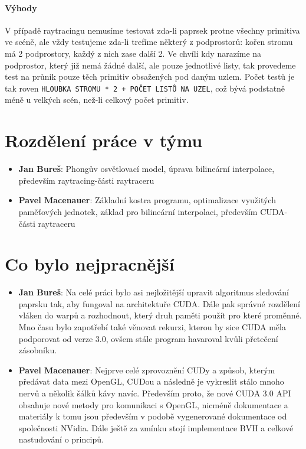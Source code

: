 \documentclass[12pt,a4paper,titlepage,final]{report}
\begin{document}
\paragraph{Výhody} V případě raytracingu nemusíme testovat zda-li paprsek protne všechny primitiva ve scéně, ale vždy testujeme zda-li trefíme některý z podprostorů: kořen stromu má 2 podprostory, každý z nich zase další 2. Ve chvíli kdy narazíme na podprostor, který již nemá žádné další, ale pouze jednotlivé listy, tak provedeme test na průnik pouze těch primitiv obsažených pod daným uzlem. Počet testů je tak roven \verb|HLOUBKA STROMU * 2 + POČET LISTŮ NA UZEL|, což bývá podstatně méně u velkých scén, než-li celkový počet primitiv.


\section{Rozdělení práce v týmu}

\begin{itemize}
\item \textbf{Jan Bureš}: Phongův osvětlovací model, úprava bilineární interpolace, především raytracing-části raytraceru
\item \textbf{Pavel Macenauer}: Základní kostra programu, optimalizace využitých paměťových jednotek, základ pro bilineární interpolaci, především CUDA-části raytraceru 
\end{itemize}

\section{Co bylo nejpracnější}

\begin{itemize}
\item \textbf{Jan Bureš}: Na celé práci bylo asi nejložitější upravit algoritmus sledování paprsku tak, aby fungoval na architektuře CUDA. Dále pak správné rozdělení vláken do warpů a rozhodnout, který druh paměti použít pro které proměnné. Mno času bylo zapotřebí také věnovat rekurzi, kterou by sice CUDA měla podporovat od verze 3.0, ovšem stále program havaroval kvůli přetečení zásobníku.
\item \textbf{Pavel Macenauer}: Nejprve celé zprovoznění CUDy a způsob, kterým předávat data mezi OpenGL, CUDou a následně je vykreslit stálo mnoho nervů a několik šálků kávy navíc. Především proto, že nové CUDA 3.0 API obsahuje nové metody pro komunikaci s OpenGL, nicméně dokumentace a materiály k tomu jsou především v podobě vygenerované dokumentace od společnosti NVidia. Dále ještě za zmínku stojí implementace BVH a celkové nastudování o principů.
\end{itemize}
\end{document}
